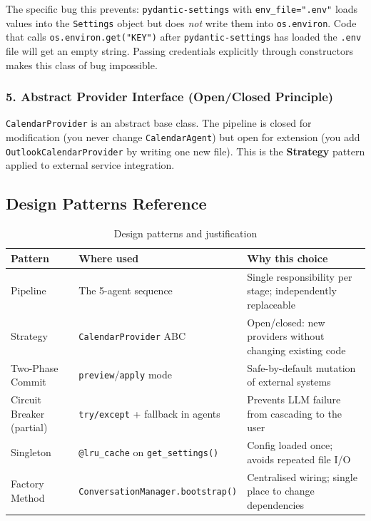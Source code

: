 \documentclass[12pt, a4paper]{article}
\begin{document}
The specific bug this prevents: \texttt{pydantic-settings} with \texttt{env\_file=".env"} loads values into the \texttt{Settings} object but does \emph{not} write them into \texttt{os.environ}. Code that calls \texttt{os.environ.get("KEY")} after \texttt{pydantic-settings} has loaded the \texttt{.env} file will get an empty string. Passing credentials explicitly through constructors makes this class of bug impossible.

\subsubsection{5. Abstract Provider Interface (Open/Closed Principle)}

\texttt{CalendarProvider} is an abstract base class. The pipeline is closed for modification (you never change \texttt{CalendarAgent}) but open for extension (you add \texttt{OutlookCalendarProvider} by writing one new file). This is the \textbf{Strategy} pattern applied to external service integration.

\subsection{Design Patterns Reference}

\begin{table}[htbp]
\centering
\small
\renewcommand{\arraystretch}{1.4}
\begin{tabularx}{\textwidth}{L{2.8cm} L{4.0cm} X}
\toprule
\textbf{Pattern} & \textbf{Where used} & \textbf{Why this choice} \\
\midrule
Pipeline
  & The 5-agent sequence
  & Single responsibility per stage; independently replaceable \\
Strategy
  & \texttt{CalendarProvider} ABC
  & Open/closed: new providers without changing existing code \\
Two-Phase Commit
  & \texttt{preview}/\texttt{apply} mode
  & Safe-by-default mutation of external systems \\
Circuit Breaker (partial)
  & \texttt{try/except} + fallback in agents
  & Prevents LLM failure from cascading to the user \\
Singleton
  & \texttt{@lru\_cache} on \texttt{get\_settings()}
  & Config loaded once; avoids repeated file I/O \\
Factory Method
  & \texttt{ConversationManager.\allowbreak bootstrap()}
  & Centralised wiring; single place to change dependencies \\
\bottomrule
\end{tabularx}
\caption{Design patterns and justification}
\end{table}
\end{document}
